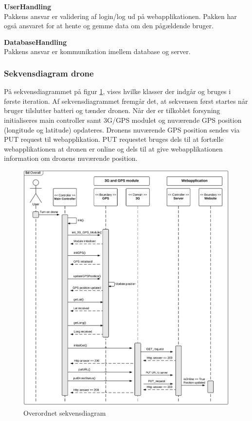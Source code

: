 \textbf{UserHandling}\\
Pakkens ansvar er validering af login/log ud på webapplikationen. Pakken har også ansvaret for at hente og gemme data om den pågældende bruger.

\textbf{DatabaseHandling}\\
Pakkens ansvar er kommunikation imellem database og server. 


\newpage
\subsubsection*{Sekvensdiagram drone}
På sekvensdiagrammet på figur \ref{fig:Sekvens_diagram_iteration1}, vises hvilke klasser der indgår og bruges i første iteration. Af sekvensdiagrammet fremgår det, at sekvensen først startes når bruger tilslutter batteri og tænder dronen. Når der er tilkoblet forsyning initialiseres main controller samt 3G/GPS modulet og nuværende GPS position  (longitude og latitude) opdateres. Dronens nuværende GPS position sendes via PUT request til webapplikation. PUT requestet bruges dels til at fortælle webapplikationen at dronen er online og dels til at give webapplikationen information om dronens nuværende position. 

\begin{figure}[H]
	\centering
	\includegraphics[width=1\textwidth]{Billeder/sekvens/sekvens_iteration1}
	\caption{Overordnet sekvensdiagram}
	\label{fig:Sekvens_diagram_iteration1}
\end{figure}
\newpage

